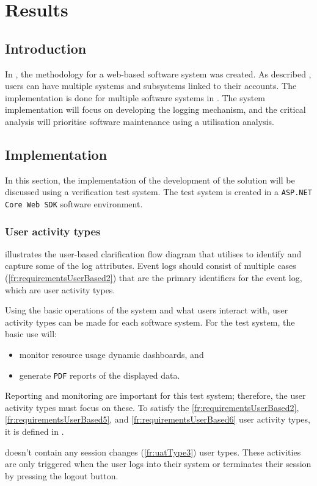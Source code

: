 \chapter{Results}
\label{chap:3}

\section{Introduction}
In , the methodology for a web-based software system was created. As described , users can have multiple systems and subsystems linked to their accounts. The implementation is done for multiple software systems in . The system implementation will focus on developing the logging mechanism, and the critical analysis will prioritise software maintenance using a utilisation analysis.

\section{Implementation}\label{sec:ch3_implementation}
In this section, the implementation of the development of the solution will be discussed using a verification test system. The test system is created in a \texttt{ASP.NET Core Web SDK} software environment.

\subsection{User activity types}
 illustrates the user-based clarification flow diagram that utilises  to identify and capture some of the log attributes. Event logs should consist of multiple cases (\ref{fr:requirementsUserBased2}) that are the primary identifiers for the event log, which are user activity types.\par Using the basic operations of the system and what users interact with, user activity types can be made for each software system. For the test system, the basic use will:

\begin{itemize}
	\item monitor resource usage dynamic dashboards, and
	\item generate \texttt{PDF} reports of the displayed data.
\end{itemize}

Reporting and monitoring are important for this test system; therefore, the user activity types must focus on these. To satisfy the \ref{fr:requirementsUserBased2}, \ref{fr:requirementsUserBased5}, and \ref{fr:requirementsUserBased6} user activity types, it is defined in . \par {} doesn't contain any session changes (\ref{fr:uatType3}) user types. These activities are only triggered when the user logs into their system or terminates their session by pressing the logout button.

